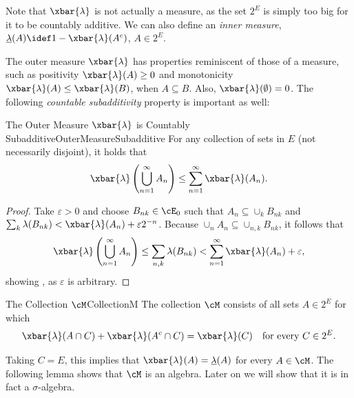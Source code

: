 Note that $\xbar{\lambda}$ is not actually a measure, as the set $2^E$ is simply too big for it to be countably additive. We can also define an \textit{inner measure}, $\underline{\lambda}(A) \idef 1 - \xbar{\lambda}(A^c)$, $A \in 2^E$.

The outer measure $\xbar{\lambda}$ has properties reminiscent of those of a measure, such as positivity $\xbar{\lambda}(A) \ge 0$ and monotonicity $\xbar{\lambda}(A) \le \xbar{\lambda}(B)$, when $A \subseteq B$. Also, $\xbar{\lambda}(\emptyset) = 0$. The following \textit{countable subadditivity} property is important as well:

\begin{lem}{The Outer Measure $\xbar{\lambda}$ is Countably Subadditive}{OuterMeasureSubadditive}
	For any collection of sets in $E$ (not necessarily disjoint), it holds that
	\begin{equation}
		\xbar{\lambda}\left(\bigcup_{n=1}^\infty A_n\right) \le \sum_{n=1}^\infty \xbar{\lambda}(A_n).
		\label{eq:OuterMeasureSubadditivity}
	\end{equation}
\end{lem}

\begin{proof}
	Take $\varepsilon > 0$ and choose $B_{nk} \in \cE_0$ such that $A_n \subseteq \cup_k B_{nk}$ and $\sum_k \lambda(B_{nk}) < \xbar{\lambda}(A_n) + \varepsilon 2^{-n}$. Because $\cup_n A_n \subseteq \cup_{n,k} B_{nk}$, it follows that
	\begin{equation*}
		\xbar{\lambda}\left(\bigcup_{n=1}^\infty A_n\right) \le \sum_{n,k} \lambda(B_{nk}) < \sum_{n=1}^\infty \xbar{\lambda}(A_n) + \varepsilon,
	\end{equation*}
	showing , as $\varepsilon$ is arbitrary.
\end{proof}

\begin{defn}{The Collection $\cM$}{CollectionM}
	The collection $\cM$ consists of all sets $A \in 2^E$ for which
	\begin{equation}
		\xbar{\lambda}(A \cap C) + \xbar{\lambda}(A^c \cap C) = \xbar{\lambda}(C) \quad \text{for every } C \in 2^E.
		\label{eq:CaratheodoryCondition}
	\end{equation}
\end{defn}

Taking $C=E$, this implies that $\xbar{\lambda}(A) = \underline{\lambda}(A)$ for every $A \in \cM$. The following lemma shows that $\cM$ is an algebra. Later on we will show that it is in fact a $\sigma$-algebra.

